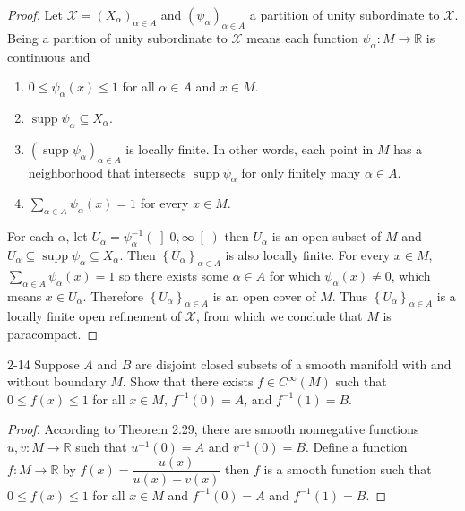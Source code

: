 \begin{proof}
    Let \( \mathcal{X} = {\left( X_{\alpha} \right)}_{\alpha \in A} \) and \( {\left( \psi_{\alpha} \right)}_{\alpha \in A} \) a partition of unity subordinate to \( \mathcal{X} \). Being a parition of unity subordinate to \( \mathcal{X} \) means each function \( \psi_{\alpha}: M \to \mathbb{R} \) is continuous and
    \begin{enumerate}[itemsep=0pt,label={(\roman*)}]
        \item \( 0 \le \psi_{\alpha}(x) \le 1 \) for all \( \alpha \in A \) and \( x \in M \).
        \item \( \operatorname{supp} \psi_{\alpha} \subseteq X_{\alpha}  \).
        \item \( {(\operatorname{supp} \psi_{\alpha})}_{\alpha \in A} \) is locally finite. In other words, each point in \( M \) has a neighborhood that intersects \( \operatorname{supp} \psi_{\alpha} \) for only finitely many \( \alpha \in A \).
        \item \( \sum_{\alpha \in A} \psi_{\alpha}(x) = 1 \) for every \( x \in M \).
    \end{enumerate}

    For each \( \alpha \), let \( U_{\alpha} = \psi_{\alpha}^{-1}( \left\rbrack 0, \infty \right\lbrack ) \) then \( U_{\alpha} \) is an open subset of \( M \) and \( U_{\alpha} \subseteq \operatorname{supp} \psi_{\alpha} \subseteq X_{\alpha} \). Then \( {\left\{ U_{\alpha} \right\}}_{\alpha \in A} \) is also locally finite. For every \( x \in M \), \( \sum_{\alpha \in A} \psi_{\alpha}(x) = 1 \) so there exists some \( \alpha \in A \) for which \( \psi_{\alpha}(x) \ne 0 \), which means \( x \in U_{\alpha} \). Therefore \( {\left\{ U_{\alpha} \right\}}_{\alpha \in A} \) is an open cover of \( M \). Thus \( {\left\{ U_{\alpha} \right\}}_{\alpha \in A} \) is a locally finite open refinement of \( \mathcal{X} \), from which we conclude that \( M \) is paracompact.
\end{proof}

\begin{problem}{2-14}
    Suppose \( A \) and \( B \) are disjoint closed subsets of a smooth manifold {\color{red}with and without boundary} \( M \). Show that there exists \( f \in C^{\infty}(M) \) such that \( 0 \le f(x) \le 1 \) for all \( x \in M \), \( f^{-1}(0) = A \), and \( f^{-1}(1) = B \).
\end{problem}

\begin{proof}
    According to Theorem 2.29, there are smooth nonnegative functions \( u, v: M \to \mathbb{R} \) such that \( u^{-1}(0) = A \) and \( v^{-1}(0) = B \). Define a function \( f: M \to \mathbb{R} \) by \( f(x) = \dfrac{u(x)}{u(x) + v(x)} \) then \( f \) is a smooth function such that \( 0 \le f(x) \le 1 \) for all \( x \in M \) and \( f^{-1}(0) = A \) and \( f^{-1}(1) = B \).
\end{proof}
